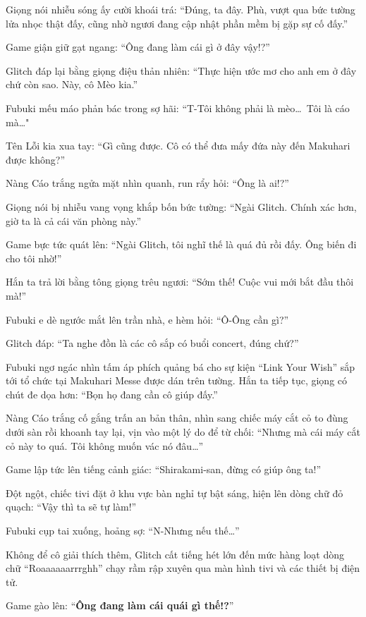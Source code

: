 \documentclass[../main.tex]{subfiles}
\begin{document}
Giọng nói nhiễu sóng ấy cười khoái trá: ``Đúng, ta đây. Phù, vượt qua bức tường lửa nhọc thật đấy, cũng nhờ ngươi đang cập nhật phần mềm bị gặp sự cố đấy.''

Game giận giữ gạt ngang: ``Ông đang làm cái gì ở đây vậy!?''

Glitch đáp lại bằng giọng điệu thản nhiên: ``Thực hiện ước mơ cho anh em ở đây chứ còn sao. Này, cô Mèo kia.''

Fubuki mếu máo phản bác trong sợ hãi: ``T-Tôi không phải là mèo\dots\ Tôi là cáo mà\dots"

Tên Lỗi kia xua tay: ``Gì cũng được. Cô có thể đưa mấy đứa này đến Makuhari được không?''

Nàng Cáo trắng ngửa mặt nhìn quanh, run rẩy hỏi: ``Ông là ai!?''

Giọng nói bị nhiễu vang vọng khắp bốn bức tường: ``Ngài Glitch. Chính xác hơn, giờ ta là cả cái văn phòng này.''

Game bực tức quát lên: ``Ngài Glitch, tôi nghĩ thế là quá đủ rồi đấy. Ông biến đi cho tôi nhờ!''

Hắn ta trả lời bằng tông giọng trêu ngươi: ``Sớm thế! Cuộc vui mới bắt đầu thôi mà!''

Fubuki e dè ngước mắt lên trần nhà, e hèm hỏi: ``Ô-Ông cần gì?''

Glitch đáp: ``Ta nghe đồn là các cô sắp có buổi concert, đúng chứ?''

Fubuki ngơ ngác nhìn tấm áp phích quảng bá cho sự kiện ``Link Your Wish'' sắp tới tổ chức tại Makuhari Messe được dán trên tường. Hắn ta tiếp tục, giọng có chút đe dọa hơn: ``Bọn họ đang cần cô giúp đấy.''

Nàng Cáo trắng cố gắng trấn an bản thân, nhìn sang chiếc máy cắt cỏ to đùng dưới sàn rồi khoanh tay lại, vịn vào một lý do để từ chối: ``Nhưng mà cái máy cắt cỏ này to quá. Tôi không muốn vác nó đâu\dots''

Game lập tức lên tiếng cảnh giác: ``Shirakami-san, đừng có giúp ông ta!''

Đột ngột, chiếc tivi đặt ở khu vực bàn nghỉ tự bật sáng, hiện lên dòng chữ đỏ quạch: ``Vậy thì ta sẽ tự làm!''


Fubuki cụp tai xuống, hoảng sợ: ``N-Nhưng nếu thế\dots''

Không để cô giải thích thêm, Glitch cất tiếng hét lớn đến mức hàng loạt dòng chữ ``Roaaaaaarrrghh'' chạy rầm rập xuyên qua màn hình tivi và các thiết bị điện tử.

Game gào lên: ``\textbf{Ông đang làm cái quái gì thế!?}''
\end{document}
